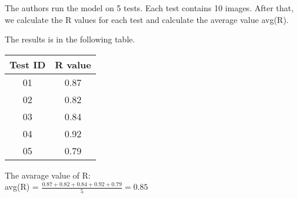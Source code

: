 The authors run the model on 5 tests. Each test contains 10 images. After that, we calculate the R values for each test and calculate the average value avg(R).

The results is in the following table.
\begin{center}
\begin{tabular}{|c|c|}
 \hline
\textbf{Test ID} & \textbf{R value}\\
\hline
01 & 0.87 \\
\hline
02 & 0.82 \\
\hline
03 & 0.84 \\
\hline
04 & 0.92 \\
\hline
05 & 0.79 \\
\hline

\end{tabular}
\end{center}

The avarage value of R:\\
avg(R) = \(\frac{0.87 + 0.82 + 0.84 + 0.92 + 0.79}{5} = 0.85\)